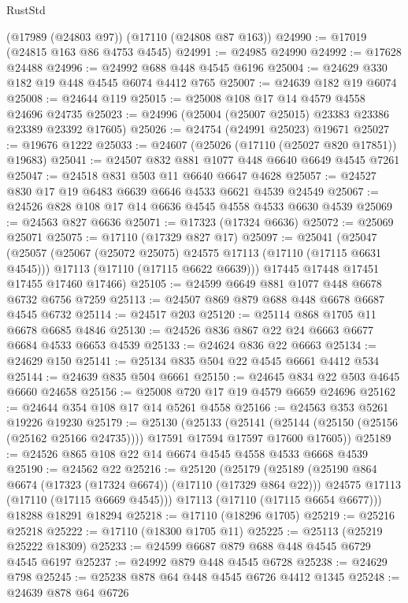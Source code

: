 \begin{lexlean}{RustStd}
\begin{coremodule}
    (@17989 (@24803 @97))
    (@17110 (@24808 @87 @163))
@24990 := @17019 (@24815 @163 @86 @4753 @4545)
@24991 := @24985 @24990
@24992 := @17628 @24488
@24996 := @24992 @688 @448 @4545 @6196
@25004 := @24629 @330 @182 @19 @448 @4545 @6074 @4412 @765
@25007 := @24639 @182 @19 @6074
@25008 := @24644 @119
@25015 := @25008 @108 @17 @14 @4579 @4558 @24696 @24735
@25023 := @24996 (@25004 (@25007 @25015) @23383 @23386 @23389 @23392 @17605)
@25026 := @24754 (@24991 @25023) @19671
@25027 := @19676 @1222
@25033 := @24607 (@25026 (@17110 (@25027 @820 @17851)) @19683)
@25041 := @24507 @832 @881 @1077 @448 @6640 @6649 @4545 @7261
@25047 := @24518 @831 @503 @11 @6640 @6647 @4628
@25057 := @24527 @830 @17 @19 @6483 @6639 @6646 @4533 @6621 @4539 @24549
@25067 := @24526 @828 @108 @17 @14 @6636 @4545 @4558 @4533 @6630 @4539
@25069 := @24563 @827 @6636
@25071 := @17323 (@17324 @6636)
@25072 := @25069 @25071
@25075 := @17110 (@17329 @827 @17)
@25097 := @25041
    (@25047
      (@25057
        (@25067 (@25072 @25075) @24575 @17113 (@17110 (@17115 @6631 @4545)))
        @17113
        (@17110 (@17115 @6622 @6639)))
      @17445
      @17448
      @17451
      @17455
      @17460
      @17466)
@25105 := @24599 @6649 @881 @1077 @448 @6678 @6732 @6756 @7259
@25113 := @24507 @869 @879 @688 @448 @6678 @6687 @4545 @6732
@25114 := @24517 @203
@25120 := @25114 @868 @1705 @11 @6678 @6685 @4846
@25130 := @24526 @836 @867 @22 @24 @6663 @6677 @6684 @4533 @6653 @4539
@25133 := @24624 @836 @22 @6663
@25134 := @24629 @150
@25141 := @25134 @835 @504 @22 @4545 @6661 @4412 @534
@25144 := @24639 @835 @504 @6661
@25150 := @24645 @834 @22 @503 @4645 @6660 @24658
@25156 := @25008 @720 @17 @19 @4579 @6659 @24696
@25162 := @24644 @354 @108 @17 @14 @5261 @4558
@25166 := @24563 @353 @5261 @19226 @19230
@25179 := @25130
    (@25133
      (@25141 (@25144 (@25150 (@25156 (@25162 @25166 @24735)))) @17591 @17594 @17597 @17600 @17605))
@25189 := @24526 @865 @108 @22 @14 @6674 @4545 @4558 @4533 @6668 @4539
@25190 := @24562 @22
@25216 := @25120
    (@25179
      (@25189
        (@25190 @864 @6674 (@17323 (@17324 @6674)) (@17110 (@17329 @864 @22)))
        @24575
        @17113
        (@17110 (@17115 @6669 @4545)))
      @17113
      (@17110 (@17115 @6654 @6677)))
    @18288
    @18291
    @18294
@25218 := @17110 (@18296 @1705)
@25219 := @25216 @25218
@25222 := @17110 (@18300 @1705 @11)
@25225 := @25113 (@25219 @25222 @18309)
@25233 := @24599 @6687 @879 @688 @448 @4545 @6729 @4545 @6197
@25237 := @24992 @879 @448 @4545 @6728
@25238 := @24629 @798
@25245 := @25238 @878 @64 @448 @4545 @6726 @4412 @1345
@25248 := @24639 @878 @64 @6726

\end{coremodule}
\end{lexlean}
